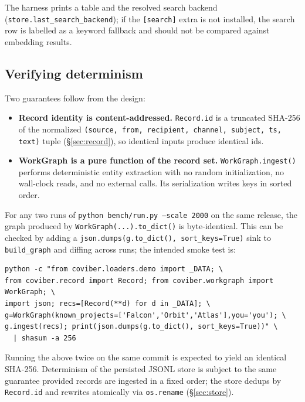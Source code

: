 The harness prints a table and the resolved search backend
(\texttt{store.last\_search\_backend}); if the \texttt{[search]} extra is not
installed, the search row is labelled as a keyword fallback and should not be
compared against embedding results.

\subsection{Verifying determinism}
\label{app:determinism}

Two guarantees follow from the design:

\begin{itemize}
  \item \textbf{Record identity is content-addressed.} \texttt{Record.id} is
        a truncated SHA-256 of the normalized \texttt{(source, from,
        recipient, channel, subject, ts, text)} tuple (\S\ref{sec:record}),
        so identical inputs produce identical ids.
  \item \textbf{WorkGraph is a pure function of the record set.}
        \texttt{WorkGraph.ingest()} performs deterministic entity extraction
        with no random initialization, no wall-clock reads, and no external
        calls. Its serialization writes keys in sorted order.
\end{itemize}

For any two runs of \texttt{python bench/run.py --scale 2000} on the same
release, the graph produced by \texttt{WorkGraph(...).to\_dict()} is
byte-identical. This can be checked by adding a \texttt{json.dumps(g.to\_dict(),
sort\_keys=True)} sink to \texttt{build\_graph} and diffing across runs;
the intended smoke test is:

\begin{verbatim}
python -c "from coviber.loaders.demo import _DATA; \
from coviber.record import Record; from coviber.workgraph import WorkGraph; \
import json; recs=[Record(**d) for d in _DATA]; \
g=WorkGraph(known_projects=['Falcon','Orbit','Atlas'],you='you'); \
g.ingest(recs); print(json.dumps(g.to_dict(), sort_keys=True))" \
  | shasum -a 256
\end{verbatim}

Running the above twice on the same commit is expected to yield an identical
SHA-256. Determinism of the persisted JSONL store is subject to the same
guarantee provided records are ingested in a fixed order; the store dedups by
\texttt{Record.id} and rewrites atomically via \texttt{os.rename}
(\S\ref{sec:store}).

